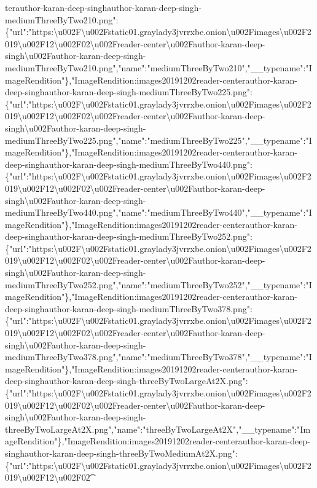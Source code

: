 terauthor-karan-deep-singhauthor-karan-deep-singh-mediumThreeByTwo210.png":\{"url":"https:\textbackslash{}u002F\textbackslash{}u002Fstatic01.graylady3jvrrxbe.onion\textbackslash{}u002Fimages\textbackslash{}u002F2019\textbackslash{}u002F12\textbackslash{}u002F02\textbackslash{}u002Freader-center\textbackslash{}u002Fauthor-karan-deep-singh\textbackslash{}u002Fauthor-karan-deep-singh-mediumThreeByTwo210.png","name":"mediumThreeByTwo210","\_\_typename":"ImageRendition"\},"ImageRendition:images20191202reader-centerauthor-karan-deep-singhauthor-karan-deep-singh-mediumThreeByTwo225.png":\{"url":"https:\textbackslash{}u002F\textbackslash{}u002Fstatic01.graylady3jvrrxbe.onion\textbackslash{}u002Fimages\textbackslash{}u002F2019\textbackslash{}u002F12\textbackslash{}u002F02\textbackslash{}u002Freader-center\textbackslash{}u002Fauthor-karan-deep-singh\textbackslash{}u002Fauthor-karan-deep-singh-mediumThreeByTwo225.png","name":"mediumThreeByTwo225","\_\_typename":"ImageRendition"\},"ImageRendition:images20191202reader-centerauthor-karan-deep-singhauthor-karan-deep-singh-mediumThreeByTwo440.png":\{"url":"https:\textbackslash{}u002F\textbackslash{}u002Fstatic01.graylady3jvrrxbe.onion\textbackslash{}u002Fimages\textbackslash{}u002F2019\textbackslash{}u002F12\textbackslash{}u002F02\textbackslash{}u002Freader-center\textbackslash{}u002Fauthor-karan-deep-singh\textbackslash{}u002Fauthor-karan-deep-singh-mediumThreeByTwo440.png","name":"mediumThreeByTwo440","\_\_typename":"ImageRendition"\},"ImageRendition:images20191202reader-centerauthor-karan-deep-singhauthor-karan-deep-singh-mediumThreeByTwo252.png":\{"url":"https:\textbackslash{}u002F\textbackslash{}u002Fstatic01.graylady3jvrrxbe.onion\textbackslash{}u002Fimages\textbackslash{}u002F2019\textbackslash{}u002F12\textbackslash{}u002F02\textbackslash{}u002Freader-center\textbackslash{}u002Fauthor-karan-deep-singh\textbackslash{}u002Fauthor-karan-deep-singh-mediumThreeByTwo252.png","name":"mediumThreeByTwo252","\_\_typename":"ImageRendition"\},"ImageRendition:images20191202reader-centerauthor-karan-deep-singhauthor-karan-deep-singh-mediumThreeByTwo378.png":\{"url":"https:\textbackslash{}u002F\textbackslash{}u002Fstatic01.graylady3jvrrxbe.onion\textbackslash{}u002Fimages\textbackslash{}u002F2019\textbackslash{}u002F12\textbackslash{}u002F02\textbackslash{}u002Freader-center\textbackslash{}u002Fauthor-karan-deep-singh\textbackslash{}u002Fauthor-karan-deep-singh-mediumThreeByTwo378.png","name":"mediumThreeByTwo378","\_\_typename":"ImageRendition"\},"ImageRendition:images20191202reader-centerauthor-karan-deep-singhauthor-karan-deep-singh-threeByTwoLargeAt2X.png":\{"url":"https:\textbackslash{}u002F\textbackslash{}u002Fstatic01.graylady3jvrrxbe.onion\textbackslash{}u002Fimages\textbackslash{}u002F2019\textbackslash{}u002F12\textbackslash{}u002F02\textbackslash{}u002Freader-center\textbackslash{}u002Fauthor-karan-deep-singh\textbackslash{}u002Fauthor-karan-deep-singh-threeByTwoLargeAt2X.png","name":"threeByTwoLargeAt2X","\_\_typename":"ImageRendition"\},"ImageRendition:images20191202reader-centerauthor-karan-deep-singhauthor-karan-deep-singh-threeByTwoMediumAt2X.png":\{"url":"https:\textbackslash{}u002F\textbackslash{}u002Fstatic01.graylady3jvrrxbe.onion\textbackslash{}u002Fimages\textbackslash{}u002F2019\textbackslash{}u002F12\textbackslash{}u002F02\t
